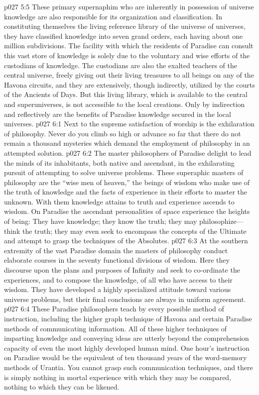 \vs p027 5:5 These primary supernaphim who are inherently in possession of universe knowledge are also responsible for its organization and classification. In constituting themselves the living reference library of the universe of universes, they have classified knowledge into seven grand orders, each having about one million subdivisions. The facility with which the residents of Paradise can consult this vast store of knowledge is solely due to the voluntary and wise efforts of the custodians of knowledge. The custodians are also the exalted teachers of the central universe, freely giving out their living treasures to all beings on any of the Havona circuits, and they are extensively, though indirectly, utilized by the courts of the Ancients of Days. But this living library, which is available to the central and superuniverses, is not accessible to the local creations. Only by indirection and reflectively are the benefits of Paradise knowledge secured in the local universes.
\vs p027 6:1 Next to the supreme satisfaction of worship is the exhilaration of philosophy. Never do you climb so high or advance so far that there do not remain a thousand mysteries which demand the employment of philosophy in an attempted solution.
\vs p027 6:2 The master philosophers of Paradise delight to lead the minds of its inhabitants, both native and ascendant, in the exhilarating pursuit of attempting to solve universe problems. These superaphic masters of philosophy are the “wise men of heaven,” the beings of wisdom who make use of the truth of knowledge and the facts of experience in their efforts to master the unknown. With them knowledge attains to truth and experience ascends to wisdom. On Paradise the ascendant personalities of space experience the heights of being: They have knowledge; they know the truth; they may philosophize---think the truth; they may even seek to encompass the concepts of the Ultimate and attempt to grasp the techniques of the Absolutes.
\vs p027 6:3 At the southern extremity of the vast Paradise domain the masters of philosophy conduct elaborate courses in the seventy functional divisions of wisdom. Here they discourse upon the plans and purposes of Infinity and seek to co\hyp{}ordinate the experiences, and to compose the knowledge, of all who have access to their wisdom. They have developed a highly specialized attitude toward various universe problems, but their final conclusions are always in uniform agreement.
\vs p027 6:4 These Paradise philosophers teach by every possible method of instruction, including the higher graph technique of Havona and certain Paradise methods of communicating information. All of these higher techniques of imparting knowledge and conveying ideas are utterly beyond the comprehension capacity of even the most highly developed human mind. One hour’s instruction on Paradise would be the equivalent of ten thousand years of the word\hyp{}memory methods of Urantia. You cannot grasp such communication techniques, and there is simply nothing in mortal experience with which they may be compared, nothing to which they can be likened.
